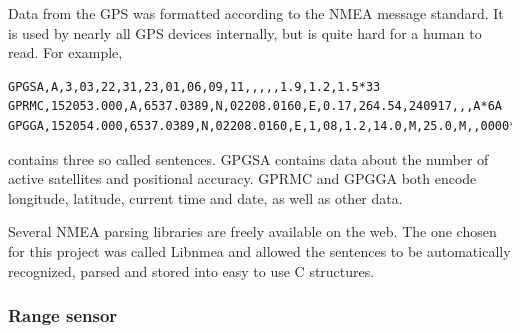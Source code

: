 Data from the GPS was formatted according to the NMEA message standard. It is used by nearly all GPS devices internally, but is quite hard for a human to read. For example,
\begin{lstlisting}
GPGSA,A,3,03,22,31,23,01,06,09,11,,,,,1.9,1.2,1.5*33
GPRMC,152053.000,A,6537.0389,N,02208.0160,E,0.17,264.54,240917,,,A*6A
GPGGA,152054.000,6537.0389,N,02208.0160,E,1,08,1.2,14.0,M,25.0,M,,0000*68
\end{lstlisting}
contains three so called sentences. GPGSA contains data about the number of active satellites and positional accuracy. GPRMC and GPGGA both encode longitude, latitude, current time and date, as well as other data.

Several NMEA parsing libraries are freely available on the web. The one chosen for this project was called Libnmea \cite{libnmea} and allowed the sentences to be automatically recognized, parsed and stored into easy to use C structures.


\subsubsection{Range sensor}
